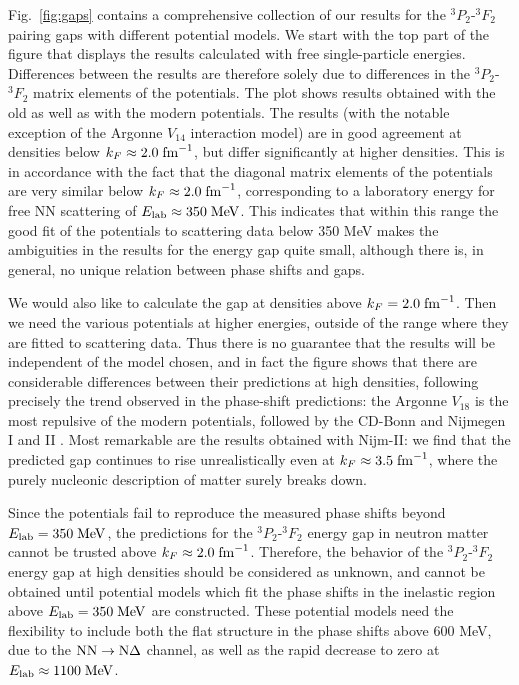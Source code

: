 \documentclass[rmp,preprint,aps,floatfix]{revtex4}
\begin{document}
Fig.~\ref{fig:gaps} contains a comprehensive collection of our results for
the $^3P_2$-$^3F_2$ pairing gaps with different potential models. 
We start with the top part of the figure that displays the results
calculated with free single-particle energies.  
Differences between the results are therefore solely due to differences 
in the $^3P_2$-$^3F_2$ matrix elements of the potentials.
The plot shows results obtained with the old as well as with the modern
potentials.
The results (with the notable exception of 
the Argonne $V_{14}$ interaction model)
are in good agreement at densities below $k_F\approx 2.0\;{\rm fm}^{-1}$, 
but differ significantly at higher densities.  
This is in accordance with the fact that 
the diagonal matrix elements of the potentials are very similar 
below $k_F\approx 2.0\;{\rm fm}^{-1}$, corresponding  
to a laboratory energy for free NN scattering 
of $E_{\rm lab} \approx 350\;{\rm MeV}$.  
This indicates that
within this range the good fit of the potentials 
to scattering data below 350 MeV makes the ambiguities in the 
results for the energy gap quite small,
although there is, in general, no unique relation between phase shifts and gaps.

We would also like to calculate the gap at densities above 
$k_F=2.0\;{\rm fm}^{-1}$.  
Then we need the various potentials at higher energies, 
outside of the range where they are fitted to scattering data.  
Thus there is no guarantee that 
the results will be independent of the model chosen, and in fact 
the figure shows that there are considerable differences 
between their predictions at high densities,
following precisely the trend observed in the phase-shift predictions:
the Argonne $V_{18}$ is the most repulsive of the modern potentials,
followed by the CD-Bonn \cite{cdbonn96} and Nijmegen I and II 
\cite{nijmegen94}.
Most remarkable are the results obtained with Nijm-II: 
we find that the predicted gap 
continues to rise unrealistically even at $k_F \approx 3.5\;{\rm fm}^{-1}$, 
where the purely nucleonic description of matter surely breaks down.

Since the potentials fail to reproduce the measured phase shifts 
beyond $E_{\rm lab}=350\;{\rm MeV}$, the predictions for the $^3P_2$-$^3F_2$ 
energy gap in neutron matter cannot be trusted above 
$k_F\approx 2.0\;{\rm fm}^{-1}$.  
Therefore, the behavior of the $^3P_2$-$^3F_2$ energy gap at high densities 
should be considered as unknown, and cannot be obtained until potential models 
which fit the phase shifts in the inelastic region 
above $E_{\rm lab}=350\;{\rm MeV}$ are constructed.  
These potential models need the flexibility to 
include both the flat structure in the phase shifts above 600 MeV, 
due to the ${\rm NN}\rightarrow{\rm N}\Delta$ channel, as well as the 
rapid decrease to zero at $E_{\rm lab}\approx 1100\;{\rm MeV}$.  
 
\end{document}
